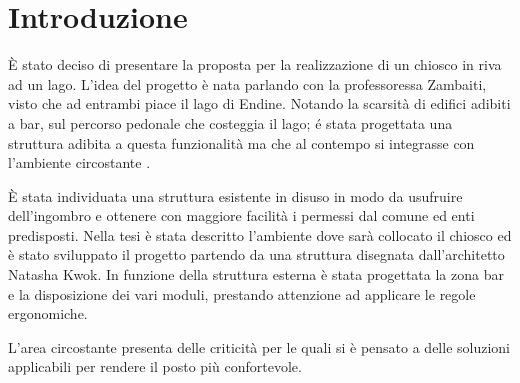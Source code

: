 \section{Introduzione}
È stato deciso di presentare la proposta per la realizzazione di un chiosco in riva ad un lago. L'idea del progetto è nata parlando con la professoressa Zambaiti, visto che ad entrambi piace il lago di Endine. Notando  la scarsità di edifici adibiti a bar, sul percorso pedonale che costeggia il lago; é stata progettata una struttura adibita a questa funzionalità  ma che al contempo si integrasse con l’ambiente circostante .

È stata individuata una struttura esistente in disuso in modo da usufruire dell'ingombro e ottenere con maggiore facilità i permessi dal comune ed enti predisposti. Nella tesi è stata descritto l’ambiente dove sarà collocato il chiosco ed è stato sviluppato il progetto partendo da una struttura disegnata dall'architetto Natasha Kwok. In funzione della struttura esterna è stata progettata la zona bar e la disposizione dei vari moduli, prestando attenzione ad applicare le regole ergonomiche.

L'area circostante presenta delle criticità per le quali si è pensato a delle soluzioni applicabili per rendere il posto più confortevole.
